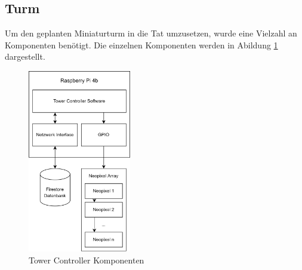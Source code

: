 \subsection{Turm}

Um den geplanten Miniaturturm in die Tat umzusetzen, wurde eine Vielzahl an Komponenten benötigt. Die einzelnen Komponenten werden in Abildung \ref{fig:tower_controller_components} dargestellt.

\begin{figure}[H]
  \centering
  \includegraphics[width=0.4\textwidth]{images/tower_controller_components.png}
  \caption{Tower Controller Komponenten}
  \label{fig:tower_controller_components}
\end{figure}



\clearpage
